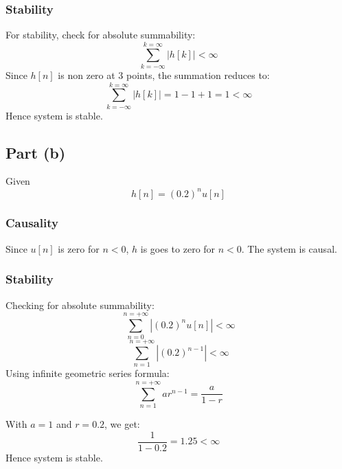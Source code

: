 \documentclass[12pt,letterpaper]{article}
\begin{document}
\subsubsection*{Stability}
For stability, check for absolute summability: 
\[
    \sum_{k = -\infty} ^ {k=\infty} | h[k] |< \infty
\]
Since $h[n]$ is non zero at 3 points, the summation reduces to:
\[
  \sum_{k = -\infty} ^ {k=\infty} | h[k] | =  1-1+1 = 1 < \infty
\]
Hence system is stable.




\subsection*{Part (b)}
Given 
\[
    h[n] = (0.2)^nu[n]
\]
\subsubsection*{Causality}
Since $u[n]$ is zero for $n<0$, $h$ is goes to zero for $n<0$. The system is causal.
\subsubsection*{Stability}
Checking for absolute summability: 
\[
    \sum_{n= 0}^{n=+\infty} |(0.2)^n u[n]| < \infty
\]
\[
    \sum_{n= 1}^{n=+\infty} |(0.2)^{n-1}| < \infty
\]
Using infinite geometric series formula:
\[
    \sum_{n= 1}^{n=+\infty} ar^{n-1}= \frac{a}{1-r}
\]

With $a = 1$ and $r = 0.2$, we get: 
\[
    \frac{1}{1-0.2} = 1.25 < \infty
\]
Hence system is stable. 
\end{document}
